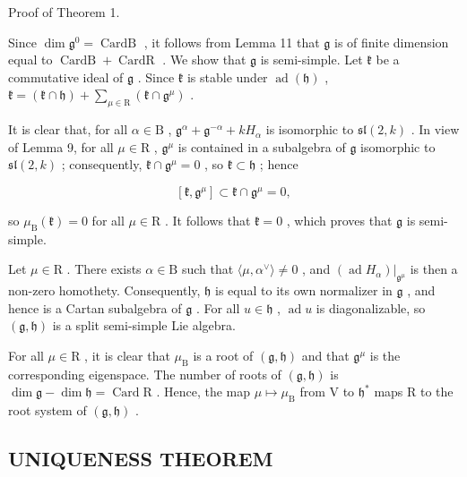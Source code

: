 Proof of Theorem 1.

Since \(\dim \mathfrak{g}^0 = \operatorname{CardB}\) , it follows from Lemma 11 that \(\mathfrak{g}\) is of finite dimension equal to \(\operatorname{CardB} + \operatorname{CardR}\) . We show that \(\mathfrak{g}\) is semi-simple. Let \(\mathfrak{k}\) be a commutative ideal of \(\mathfrak{g}\) . Since \(\mathfrak{k}\) is stable under \(\operatorname{ad}(\mathfrak{h})\) , \(\mathfrak{k} = (\mathfrak{k} \cap \mathfrak{h}) + \sum_{\mu \in \mathrm{R}} (\mathfrak{k} \cap \mathfrak{g}^\mu)\) .

It is clear that, for all \(\alpha \in \mathrm{B}\) , \(\mathfrak{g}^{\alpha} + \mathfrak{g}^{-\alpha} + kH_{\alpha}\) is isomorphic to \(\mathfrak{sl}(2,k)\) . In view of Lemma 9, for all \(\mu \in \mathrm{R}\) , \(\mathfrak{g}^{\mu}\) is contained in a subalgebra of \(\mathfrak{g}\) isomorphic to \(\mathfrak{sl}(2,k)\) ; consequently, \(\mathfrak{k} \cap \mathfrak{g}^{\mu} = 0\) , so \(\mathfrak{k} \subset \mathfrak{h}\) ; hence

\[
[ \mathfrak {k}, \mathfrak {g} ^ {\mu} ] \subset \mathfrak {k} \cap \mathfrak {g} ^ {\mu} = 0,
\]

so \(\mu_{\mathrm{B}}(\mathfrak{k}) = 0\) for all \(\mu \in \mathrm{R}\) . It follows that \(\mathfrak{k} = 0\) , which proves that \(\mathfrak{g}\) is semi-simple.

Let \(\mu \in \mathrm{R}\) . There exists \(\alpha \in \mathrm{B}\) such that \(\langle \mu, \alpha^{\vee} \rangle \neq 0\) , and \((\operatorname{ad} H_{\alpha})|_{\mathfrak{g}^{\mu}}\) is then a non-zero homothety. Consequently, \(\mathfrak{h}\) is equal to its own normalizer in \(\mathfrak{g}\) , and hence is a Cartan subalgebra of \(\mathfrak{g}\) . For all \(u \in \mathfrak{h}\) , \(\operatorname{ad} u\) is diagonalizable, so \((\mathfrak{g}, \mathfrak{h})\) is a split semi-simple Lie algebra.

For all \(\mu \in \mathrm{R}\) , it is clear that \(\mu_{\mathrm{B}}\) is a root of \((\mathfrak{g},\mathfrak{h})\) and that \(\mathfrak{g}^{\mu}\) is the corresponding eigenspace. The number of roots of \((\mathfrak{g},\mathfrak{h})\) is \(\dim \mathfrak{g} - \dim \mathfrak{h} = \operatorname{Card}\mathrm{R}\) . Hence, the map \(\mu \mapsto \mu_{\mathrm{B}}\) from V to \(\mathfrak{h}^*\) maps R to the root system of \((\mathfrak{g},\mathfrak{h})\) .

\subsection{UNIQUENESS THEOREM}

